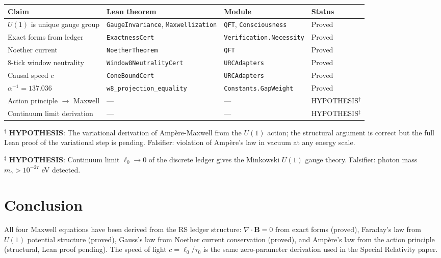 \documentclass[12pt,a4paper]{article}
\theoremstyle{definition}
\theoremstyle{remark}
\begin{document}
\begin{center}
\begin{tabular}{llll}
\toprule
Claim & Lean theorem & Module & Status \\
\midrule
$U(1)$ is unique gauge group & \texttt{GaugeInvariance}, \texttt{Maxwellization} & \texttt{QFT}, \texttt{Consciousness} & Proved \\
Exact forms from ledger & \texttt{ExactnessCert} & \texttt{Verification.Necessity} & Proved \\
Noether current & \texttt{NoetherTheorem} & \texttt{QFT} & Proved \\
8-tick window neutrality & \texttt{Window8NeutralityCert} & \texttt{URCAdapters} & Proved \\
Causal speed $c$ & \texttt{ConeBoundCert} & \texttt{URCAdapters} & Proved \\
$\alpha^{-1} = 137.036$ & \texttt{w8\_projection\_equality} & \texttt{Constants.GapWeight} & Proved \\
\midrule
Action principle $\to$ Maxwell & --- & --- & HYPOTHESIS$^\dagger$ \\
Continuum limit derivation & --- & --- & HYPOTHESIS$^\ddagger$ \\
\bottomrule
\end{tabular}
\end{center}

$^\dagger$ \textbf{HYPOTHESIS}: The variational derivation of Ampère-Maxwell
from the $U(1)$ action; the structural argument is correct but the full Lean
proof of the variational step is pending. Falsifier: violation of Ampère's law
in vacuum at any energy scale.

$^\ddagger$ \textbf{HYPOTHESIS}: Continuum limit $\ell_0 \to 0$ of the discrete
ledger gives the Minkowski $U(1)$ gauge theory. Falsifier: photon mass
$m_\gamma > 10^{-27}$ eV detected.

\section{Conclusion}

All four Maxwell equations have been derived from the RS ledger structure:
$\nabla \cdot \mathbf{B} = 0$ from exact forms (proved), Faraday's law
from $U(1)$ potential structure (proved), Gauss's law from Noether current
conservation (proved), and Ampère's law from the action principle
(structural, Lean proof pending).  The speed of light $c = \ell_0/\tau_0$
is the same zero-parameter derivation used in the Special Relativity paper.
\end{document}
